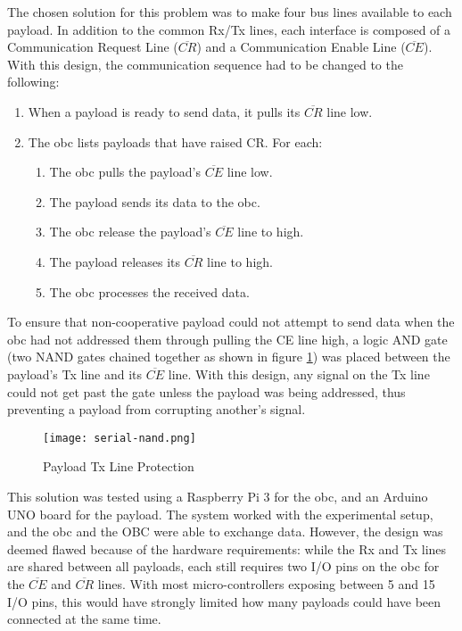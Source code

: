The chosen solution for this problem was to make four bus lines available to
each payload. In addition to the common Rx/Tx lines, each interface is composed
of a Communication Request Line ($\overline{CR}$) and a Communication Enable
Line ($\overline{CE}$). With this design, the communication sequence had to
be changed to the following:

\begin{enumerate}
\item When a payload is ready to send data, it pulls its $\overline{CR}$ line
low.
\item The \acrshort{obc} lists payloads that have raised CR. For each:
\begin{enumerate}
    \item The \acrshort{obc} pulls the payload's $\overline{CE}$ line low.
    \item The payload sends its data to the \acrshort{obc}.
    \item The \acrshort{obc} release the payload's $\overline{CE}$ line to high.
    \item The payload releases its $\overline{CR}$ line to high.
    \item The \acrshort{obc} processes the received data.
\end{enumerate}
\end{enumerate}

To ensure that non-cooperative payload could not attempt to send data when the
\acrshort{obc} had not addressed them through pulling the CE line high, a logic
AND gate (two NAND gates chained together as shown in figure \ref{fig:uart-nor})
was placed between the payload's Tx line and its $\overline{CE}$ line. With
this design, any signal on the Tx line could not get past the gate unless the
payload was being addressed, thus preventing a payload from corrupting
another's signal.

\begin{figure}[H]
\texttt{[image: serial-nand.png]}
\centering
\caption{Payload Tx Line Protection}
\label{fig:uart-nor}
\end{figure}

This solution was tested using a Raspberry Pi 3 for the \acrlong{obc}, and an
Arduino UNO board for the payload. The system worked with the experimental
setup, and the \acrlong{obc} and the OBC were able to exchange data. However,
the design was deemed flawed because of the hardware requirements: while the Rx
and Tx lines are shared between all payloads, each still requires two I/O pins
on the \acrshort{obc} for the $\overline{CE}$ and $\overline{CR}$ lines. With
most micro-controllers exposing between 5 and 15 I/O pins, this would have
strongly limited how many payloads could have been connected at the same time.

